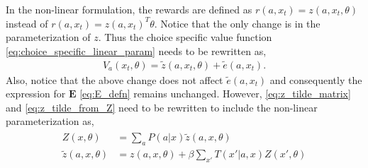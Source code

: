 \documentclass{article}
\begin{document}
In the non-linear formulation, the rewards are defined as $r(a, x_t) = z(a, x_t, \theta)$ instead of $r(a, x_t) = z(a, x_t)^T\theta$. Notice that the only change is in the parameterization of $z$. Thus the choice specific value function \eqref{eq:choice_specific_linear_param} needs to be rewritten as,
\begin{align}\label{eq:choice_specific_non_linear_param}
V_a(x_t, \theta) = \tilde{z}(a, x_t, \theta) + \tilde{e}(a, x_t). 
\end{align}
Also, notice that the above change does not affect $\tilde{e}(a, x_t)$ and consequently the expression for $\mathbf{E}$ \eqref{eq:E_defn} remains unchanged. However, \eqref{eq:z_tilde_matrix} and \eqref{eq:z_tilde_from_Z} need to be rewritten to include the non-linear parameterization as,
\begin{align}
\begin{split}
Z(x, \theta) &= \sum_{a}P(a|x)\tilde{z}(a, x, \theta) \\
\tilde{z}(a, x, \theta) &= z(a, x, \theta) + \beta\sum_{x'}T(x'|a, x)Z(x', \theta)
\end{split}
\end{align}
\end{document}
